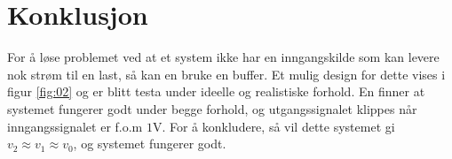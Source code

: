 \section{Konklusjon}
\label{sec:konklusjon}

For å løse problemet ved at et system ikke har en inngangskilde som kan levere nok strøm til en last, så kan en bruke en buffer. Et mulig design for dette vises i figur \ref{fig:02} og er blitt testa under ideelle og realistiske forhold. En finner at systemet fungerer godt under begge forhold, og utgangssignalet klippes når inngangssignalet er f.o.m $1\text{V}$. For å konkludere, så vil dette systemet gi $v_2\approx v_1\approx v_0$, og systemet fungerer godt.